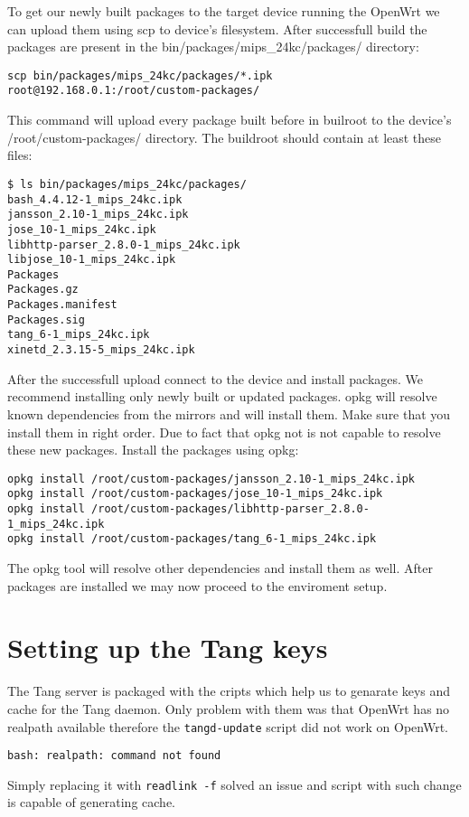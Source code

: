 To get our newly built packages to the target device running the OpenWrt we can upload them using scp to device's filesystem.
After successfull build the packages are present in the bin/packages/mips\_24kc/packages/ directory:
\begin{lstlisting}[columns=fixed,basicstyle=\ttfamily\footnotesize,tabsize=4,backgroundcolor=\color{yellow!10}]
scp bin/packages/mips_24kc/packages/*.ipk root@192.168.0.1:/root/custom-packages/
\end{lstlisting}
This command will upload every package built before in builroot to the device's /root/custom-packages/ directory.
The buildroot should contain at least these files:
\begin{lstlisting}[columns=fixed,basicstyle=\ttfamily\footnotesize,tabsize=4,backgroundcolor=\color{yellow!10}]
$ ls bin/packages/mips_24kc/packages/
bash_4.4.12-1_mips_24kc.ipk
jansson_2.10-1_mips_24kc.ipk
jose_10-1_mips_24kc.ipk
libhttp-parser_2.8.0-1_mips_24kc.ipk
libjose_10-1_mips_24kc.ipk
Packages
Packages.gz
Packages.manifest
Packages.sig
tang_6-1_mips_24kc.ipk
xinetd_2.3.15-5_mips_24kc.ipk
\end{lstlisting}
After the successfull upload connect to the device and install packages.
We recommend installing only newly built or updated packages.
opkg will resolve known dependencies from the mirrors and will install them.
Make sure that you install them in right order.
Due to fact that opkg not is not capable to resolve these new packages.
Install the packages using opkg:
\begin{lstlisting}[columns=fixed,basicstyle=\ttfamily\footnotesize,tabsize=4,backgroundcolor=\color{yellow!10}]
opkg install /root/custom-packages/jansson_2.10-1_mips_24kc.ipk
opkg install /root/custom-packages/jose_10-1_mips_24kc.ipk
opkg install /root/custom-packages/libhttp-parser_2.8.0-1_mips_24kc.ipk
opkg install /root/custom-packages/tang_6-1_mips_24kc.ipk
\end{lstlisting}
The opkg tool will resolve other dependencies and install them as well.
After packages are installed we may now proceed to the enviroment setup.



\section{Setting up the Tang keys}
The Tang server is packaged with the cripts which help us to genarate keys and cache for the Tang daemon.
Only problem with them was that OpenWrt has no realpath available therefore the {\tt tangd-update} script did not work on OpenWrt.
\begin{lstlisting}[columns=fixed,basicstyle=\ttfamily\footnotesize,tabsize=4,backgroundcolor=\color{yellow!10}]
bash: realpath: command not found
\end{lstlisting}
Simply replacing it with {\tt readlink -f} solved an issue and script with such change is capable of generating cache.

